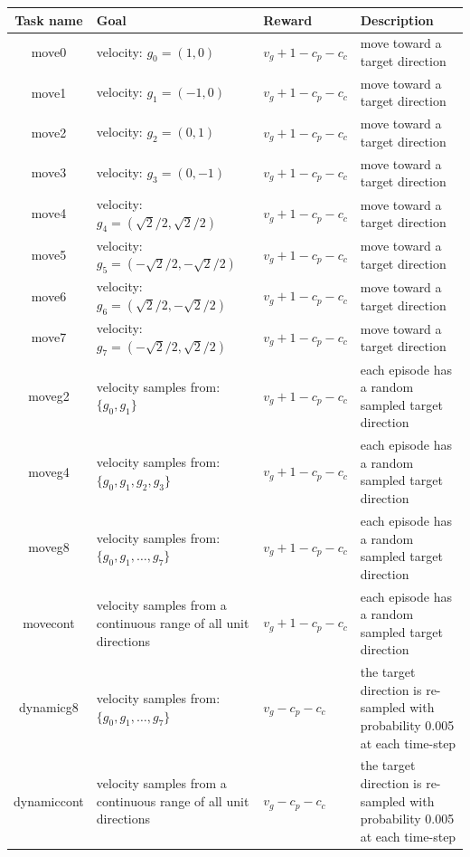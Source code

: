 \begin{table}[!htbp]

\begin{center}
\begin{tabular}{|c|p{3cm}|p{4cm}|p{4cm}|}
\hline
Task name & Goal & Reward  &  Description \\
\hline\hline
move0 & velocity: $g_0=(1,0)$ &$ v_g+1-c_p-c_c$  & move toward a target direction \\
\hline
move1 & velocity: $g_1=(-1,0)$ &$ v_g+1-c_p-c_c$  & move toward a target direction\\
\hline
move2 & velocity: $g_2=(0,1)$ &$ v_g+1-c_p-c_c$  & move toward a target direction \\
\hline
move3 & velocity: $g_3=(0,-1)$ &$ v_g+1-c_p-c_c$  & move toward a target direction \\ 
\hline 
move4 & velocity: $g_4=(\sqrt{2}/2,\sqrt{2}/2)$ &$ v_g+1-c_p-c_c$  & move toward a target direction \\ 
\hline 
move5 & velocity: $g_5=(-\sqrt{2}/2,-\sqrt{2}/2)$ &$ v_g+1-c_p-c_c$  & move toward a target direction \\ 
\hline 
move6 & velocity: $g_6=(\sqrt{2}/2,-\sqrt{2}/2)$ &$ v_g+1-c_p-c_c$  & move toward a target direction \\ 
\hline 
move7 & velocity: $g_7=(-\sqrt{2}/2,\sqrt{2}/2)$ &$ v_g+1-c_p-c_c$  & move toward a target direction \\ 
\hline 
moveg2 & velocity samples from: $\{g_0,g_1\}$ &$ v_g+1-c_p-c_c$  & each episode has a random sampled target direction \\ \hline
moveg4 & velocity samples from: $\{g_0,g_1,g_2,g_3\}$ &$ v_g+1-c_p-c_c$  & each episode has a random sampled target direction \\ \hline
moveg8 & velocity samples from: $\{g_0,g_1, \dots,g_7\}$ &$ v_g+1-c_p-c_c$  & each episode has a random sampled target direction \\ \hline
movecont & velocity samples from a continuous range of all unit directions&$ v_g+1-c_p-c_c$  & each episode has a random sampled target direction \\ \hline
dynamicg8 &  velocity samples from: $\{g_0,g_1, \dots,g_7\}$ &$ v_g-c_p-c_c$  & the target direction is re-sampled with probability 0.005 at each time-step  \\ \hline
dynamiccont & velocity samples from a continuous range of all unit directions &$ v_g-c_p-c_c$  & the target direction is re-sampled with probability 0.005 at each time-step  \\ \hline

\end{tabular}
\end{center}
\end{table}
